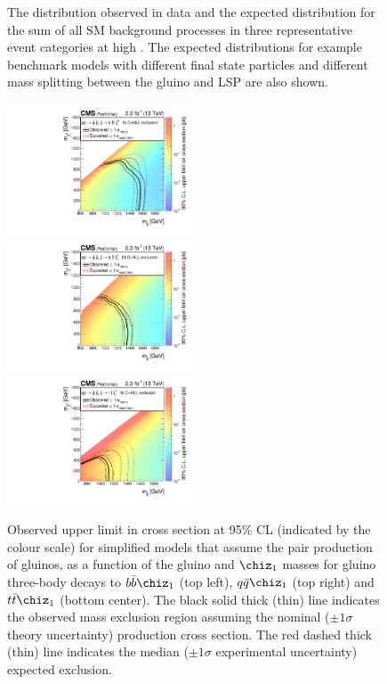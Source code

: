 \begin{figure}[tbhp]
\begin{center}
  \end{center}
  \caption{ The \mht distribution observed in data and the expected
    distribution for the sum of all SM background processes in three 
    representative event categories at high \scalht. The expected
    distributions for example benchmark models with different final state 
    particles and different mass splitting between the gluino and LSP 
    are also shown. \label{fig:mht-templates} }
\end{figure}
  
\begin{figure}[thp!]
  \begin{center}
    \includegraphics[width=0.49\textwidth]{t1bbbbRA1XSEC.pdf}~~
    \includegraphics[width=0.49\textwidth]{t1qqqqRA1XSEC.pdf} \\
    \includegraphics[width=0.49\textwidth]{t1ttttRA1XSEC.pdf}
    \caption{Observed upper limit in cross section at 95\% CL
      (indicated by the colour scale) for simplified models that
      assume the pair production of gluinos, as a function of the
      gluino and $\chiz_{1}$ masses for gluino three-body decays to
      $b\bar{b}\chiz_{1}$ (top left), $q\bar{q}\chiz_{1}$ (top right) and $t\bar{t}\chiz_{1}$ (bottom center). 
      The black solid thick (thin) line indicates the observed mass
      exclusion region assuming the nominal (${\pm}1 \sigma$ theory
      uncertainty) production cross section. The red dashed thick
      (thin) line indicates the median (${\pm}1 \sigma$ experimental
      uncertainty) expected exclusion.
      \label{fig:limits-sms} }
  \end{center}
\end{figure}

